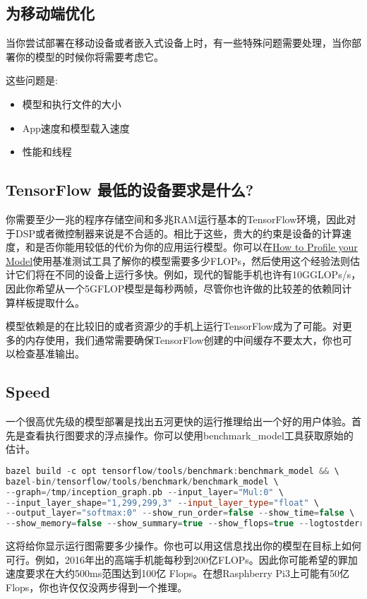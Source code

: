 \subsection{为移动端优化}
当你尝试部署在移动设备或者嵌入式设备上时，有一些特殊问题需要处理，当你部署你的模型的时候你将需要考虑它。

这些问题是:
\begin{itemize}
\item 模型和执行文件的大小
\item App速度和模型载入速度
\item 性能和线程
\end{itemize}
\subsection{TensorFlow 最低的设备要求是什么?}
你需要至少一兆的程序存储空间和多兆RAM运行基本的TensorFlow环境，因此对于DSP或者微控制器来说是不合适的。相比于这些，贵大的约束是设备的计算速度，和是否你能用较低的代价为你的应用运行模型。你可以在\href{https://www.tensorflow.org/mobile/optimizing?hl=zh-cn#how_to_profile_your_model}{How to Profile your Model}使用基准测试工具了解你的模型需要多少FLOPs，然后使用这个经验法则估计它们将在不同的设备上运行多快。例如，现代的智能手机也许有10GGLOPs/s，因此你希望从一个5GFLOP模型是每秒两帧，尽管你也许做的比较差的依赖同计算样板提取什么。

模型依赖是的在比较旧的或者资源少的手机上运行TensorFlow成为了可能。对更多的内存使用，我们通常需要确保TensorFlow创建的中间缓存不要太大，你也可以检查基准输出。

\subsection{Speed}
一个很高优先级的模型部署是找出五河更快的运行推理给出一个好的用户体验。首先是查看执行图要求的浮点操作。你可以使用benchmark\_model工具获取原始的估计。
\begin{lstlisting}[language=C++]
bazel build -c opt tensorflow/tools/benchmark:benchmark_model && \
bazel-bin/tensorflow/tools/benchmark/benchmark_model \
--graph=/tmp/inception_graph.pb --input_layer="Mul:0" \
--input_layer_shape="1,299,299,3" --input_layer_type="float" \
--output_layer="softmax:0" --show_run_order=false --show_time=false \
--show_memory=false --show_summary=true --show_flops=true --logtostderr
\end{lstlisting}
这将给你显示运行图需要多少操作。你也可以用这信息找出你的模型在目标上如何可行。例如，2016年出的高端手机能每秒到200亿FLOPs。因此你可能希望的罪加速度要求在大约500ms范围达到100亿 Flops。在想Rasphberry Pi3上可能有50亿Flops，你也许仅仅没两步得到一个推理。

